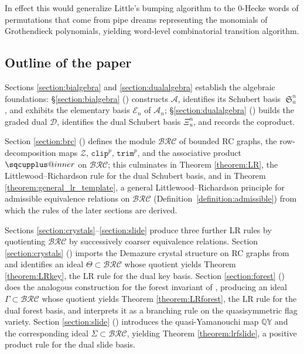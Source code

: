 \documentclass{amsart}
\makeatletter
\newcommand{\sqcupplus@inner}[2]{%
  \vcenter{\hbox{\ooalign{%
    \hfil$\m@th#1\sqcup$\hfil\cr
    \hfil\raisebox{0.15ex}{$\m@th#1\scriptscriptstyle+$}\hfil\cr
  }}}%
}
\newcommand{\sqcupplus}{\mathbin{\mathpalette\sqcupplus@inner\relax}}
\theoremstyle{definition}
\theoremstyle{remark}
\numberwithin{equation}{subsection}
\DeclareMathOperator{\sch}{\mathfrak{S}}
\newcommand{\QY}{\ensuremath{\mathbb{QY}}}
\newcommand{\trm}{\mathtt{trim}}
\newcommand{\zeromap}{\mathcal{Z}}
\newcommand{\clp}{\mathtt{clip}}
\newcommand{\BRC}{\mathcal{BRC}}
\newcommand{\dsch}{\ensuremath{\Xi}}
\newcommand{\coma}{\mathcal{A}}
\newcommand{\dcoma}{\mathcal{D}}
\makeatother
\begin{document}
In effect this would generalize Little's bumping algorithm to the $0$-Hecke words of permutations that come from pipe dreams representing the monomials of Grothendieck polynomials, yielding word-level combinatorial transition algorithm.
\subsection*{Outline of the paper}

Sections \ref{section:bialgebra} and \ref{section:dualalgebra} establish the algebraic foundations: \S\ref{section:bialgebra} () constructs $\coma$, identifies its Schubert basis $\sch_u^n$, and exhibits the elementary basis $\mathcal{E}_n$ of $\coma_n$; \S\ref{section:dualalgebra} () builds the graded dual $\dcoma$, identifies the dual Schubert basis $\dsch_u^n$, and records the coproduct.

Section \ref{section:brc} () defines the module $\BRC$ of bounded RC graphs, the row-decomposition maps $\zeromap$, $\clp^p$, $\trm^p$, and the associative product $\sqcupplus$ on $\BRC$; this culminates in Theorem \ref{theorem:LR}, the Littlewood--Richardson rule for the dual Schubert basis, and in Theorem \ref{theorem:general_lr_template}, a general Littlewood--Richardson principle for admissible equivalence relations on $\BRC$ (Definition~\ref{definition:admissible}) from which the rules of the later sections are derived.

Sections \ref{section:crystals}--\ref{section:slide} produce three further LR rules by quotienting $\BRC$ by successively coarser equivalence relations. Section \ref{section:crystals} () imports the Demazure crystal structure on RC graphs from \cite{assaf2018demazure} and identifies an ideal $\Theta\subset\BRC$ whose quotient yields Theorem \ref{theorem:LRkey}, the LR rule for the dual key basis. Section \ref{section:forest} () does the analogous construction for the forest invariant of \cite{nadeau2024forest}, producing an ideal $\Gamma\subset\BRC$ whose quotient yields Theorem \ref{theorem:LRforest}, the LR rule for the dual forest basis, and interprets it as a branching rule on the quasisymmetric flag variety. Section \ref{section:slide} () introduces the quasi-Yamanouchi map $\QY$ and the corresponding ideal $\Sigma\subset\BRC$, yielding Theorem \ref{theorem:lrfslide}, a positive product rule for the dual slide basis.
\end{document}
